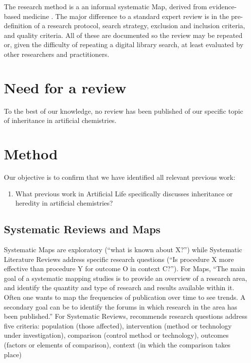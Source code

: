 The research method is a an informal systematic Map, derived from evidence-based medicine \parencite{Cochrane:2011qy, CRD:2008fj}. The major difference to a standard expert review is in the pre-definition of a research protocol, search strategy, exclusion and inclusion criteria, and quality criteria. All of these are documented so the review may be repeated or, given the difficulty of repeating a digital library search, at least evaluated by other researchers and practitioners.

\section{Need for a review}

To the best of our knowledge, no review has been published of our specific topic of inheritance in artificial chemistries.

\section{Method}
Our objective is to confirm that we have identified all relevant previous work:

\begin{enumerate}[label=RQ\arabic*:]
	\item What previous work in Artificial Life specifically discusses inheritance or heredity in artificial chemistries?
\end{enumerate}

\subsection{Systematic Reviews and Maps}

Systematic Maps \parencite{Petersen:2008fk} are exploratory (``what is known about X?'') while Systematic Literature Reviews \parencite{Kitchenham:2007nx} address specific research questions (``Is procedure X more effective than procedure Y for outcome O in context C?''). For Maps, ``The main goal of a systematic mapping studies is to provide an overview of a research area, and identify the quantity and type of research and results available within it. Often one wants to map the frequencies of publication over time to see trends. A secondary goal can be to identify the forums in which research in the area has been published.'' \parencite{Petersen:2008fk} For Systematic Reviews, \cite{Kitchenham:2007nx} recommends research questions address five criteria: population (those affected), intervention (method or technology under investigation), comparison (control method or technology), outcomes (factors or elements of comparison), context (in which the comparison takes place)

